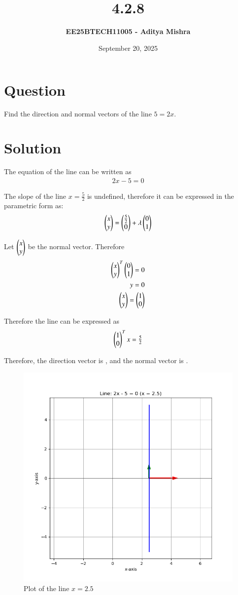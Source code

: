\documentclass[12pt]{article}
\title{\textbf{4.2.8}}
\author{\textbf{EE25BTECH11005 - Aditya Mishra}}
\date{September 20, 2025}
\begin{document}
\maketitle

\section*{Question}
Find the direction and normal vectors of the line $5 = 2x$.

\section*{Solution}

The equation of the line can be written as
\begin{align}
2x - 5 = 0
\end{align}

The slope of the line $x = \frac{5}{2}$ is undefined, therefore it can be expressed in the parametric form as:
\begin{align}
\begin{pmatrix}x\\y\end{pmatrix} = \begin{pmatrix}\tfrac{5}{2}\\0\end{pmatrix} + \lambda\begin{pmatrix}0\\1\end{pmatrix}
\end{align}

Let $\begin{pmatrix}x\\y\end{pmatrix}$ be the normal vector. Therefore
\begin{align}
\begin{pmatrix}x\\ y\end{pmatrix}^T\begin{pmatrix}0\\1\end{pmatrix} = 0 \\
y = 0\\
\begin{pmatrix}x\\y\end{pmatrix} = \begin{pmatrix}1\\0\end{pmatrix}
\end{align}

Therefore the line can be expressed as
\begin{align}
\begin{pmatrix}1\\0\end{pmatrix}^Tx = \tfrac{5}{2}
\end{align}

\vspace{0.5cm}

Therefore, the direction vector is , and the normal vector is .

\begin{figure}[H]
    \centering
    \includegraphics[width=0.7\columnwidth]{Figs/Figure_1.png}
    \caption{Plot of the line $x = 2.5$}
    \label{Fig_428}
\end{figure}
\end{document}
